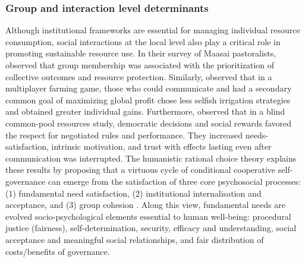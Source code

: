 \subsubsection{Group and interaction level determinants}
Although institutional frameworks are essential for managing individual resource consumption, social interactions at the local level also play a critical role in promoting sustainable resource use. In their survey of Maasai pastoralists, \cite{rabinovichProtectingCommonsPredictors2020} observed that group membership was associated with the prioritization of collective outcomes and resource protection. Similarly, \cite{cuadradoRoleProsocialnessTrust2017} observed that in a multiplayer farming game, those who could communicate and had a secondary common goal of maximizing global profit chose less selfish irrigation strategies and obtained greater individual gains. Furthermore, \cite{decaroSynergisticEffectsVoting2015,decaroMotivationalFoundationsCommunication2021} observed that in a blind common-pool resources study, democratic decisions and social rewards favored the respect for negotiated rules and performance. They increased needs-satisfaction, intrinsic motivation, and trust with effects lasting even after communication was interrupted. The humanistic rational choice theory explains these results by proposing that a virtuous cycle of conditional cooperative self-governance can emerge from the satisfaction of three core psychosocial processes: (1) fundamental need satisfaction, (2) institutional internalisation and acceptance, and (3) group cohesion \cite{decaroMotivationalFoundationsCommunication2021}. Along this view, fundamental needs are evolved socio-psychological elements essential to human well-being: procedural justice (fairness), self-determination, security, efficacy and understanding, social acceptance and meaningful social relationships, and fair distribution of costs/benefits of governance.

